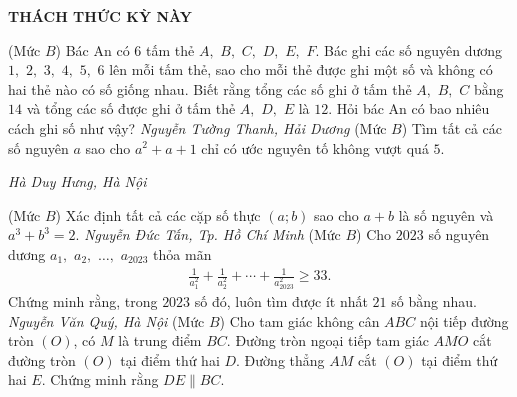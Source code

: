\begin{center}
	\vspace*{-5pt}
	\textbf{\color{thachthuctoanhoc}\color{thachthuctoanhoc}\color{thachthuctoanhoc}THÁCH THỨC KỲ NÀY}
	\vspace*{-5pt}
\end{center}
\begin{multicols}{2}
	\setlength{\abovedisplayskip}{4pt}
	\setlength{\belowdisplayskip}{4pt}
	{}
	(Mức $B$) Bác An có $6$ tấm thẻ $A,$ $B,$ $C,$ $D,$ $E,$ $F$. Bác ghi các số nguyên dương $1,$ $2,$ $3,$ $4,$ $5,$ $6$ lên mỗi tấm thẻ, sao cho mỗi thẻ được ghi một số và không có hai thẻ nào có số giống nhau. Biết rằng tổng các số ghi ở tấm thẻ $A,$ $B,$ $C$ bằng $14$ và tổng các số được ghi ở tấm thẻ $A,$ $D,$ $E$ là $12$. Hỏi bác An có bao nhiêu cách ghi số như vậy?
	\vskip 0.3cm
	\hfill	\textit{Nguyễn Tường Thanh, Hải Dương}
	\vskip 0.3cm
	{}
	(Mức $B$) Tìm tất cả các số nguyên $a$ sao cho $a^2+a+1$ chỉ có ước nguyên tố không vượt quá $5$. 
	\begin{flushright}
		\textit{Hà Duy Hưng, Hà Nội}
	\end{flushright}
	{}
	(Mức $B$) Xác định tất cả các cặp số thực $(a;b)$ sao cho $a+b$ là số nguyên và $a^3+b^3=2$. 
	\vskip 0.1cm
	\hfill	\textit{Nguyễn Đức Tấn, Tp. Hồ Chí Minh}
	\vskip 0.1cm
	{}
	(Mức $B$) Cho $2023$ số nguyên dương $a_1,$ $a_2,$ $\ldots,$ $a_{2023}$ thỏa mãn
	\begin{align*}
		\frac{1}{a_1^2}+\frac{1}{a_2^2}+\cdots+\frac{1}{a_{2023}^2}\ge 33.
	\end{align*}
	Chứng minh rằng, trong $2023$ số đó, luôn tìm được ít nhất $21$ số bằng nhau.  
	\vskip 0.1cm
	\hfill	\textit{Nguyễn Văn Quý, Hà Nội}
	\vskip 0.1cm
	{}
	(Mức $B$) Cho tam giác không cân $ABC$ nội tiếp đường tròn $(O)$, có $M$ là trung điểm $BC$. Đường tròn ngoại tiếp tam giác $AMO$ cắt đường tròn $(O)$ tại điểm thứ hai $D$. Đường thẳng $AM$ cắt $(O)$  tại điểm thứ hai $E$. Chứng minh rằng $DE\| BC$. 
	\begin{center}
		\begin{tikzpicture}[thachthuctoanhoc,scale=0.5, node font=\small]

\end{tikzpicture}
\end{center}
\end{multicols}
